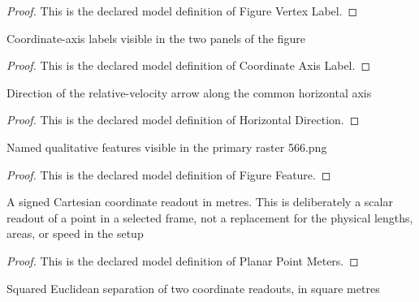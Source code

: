\begin{proof}
  This is the declared model definition of Figure Vertex Label.
\end{proof}
\begin{definition}
  \label{def:physics:phyx-mini-0566:phyxminiproblems-problemphyxmini0566-coordinateaxislabel}
  Coordinate-axis labels visible in the two panels of the figure
\end{definition}
\begin{proof}
  This is the declared model definition of Coordinate Axis Label.
\end{proof}
\begin{definition}
  \label{def:physics:phyx-mini-0566:phyxminiproblems-problemphyxmini0566-horizontaldirection}
  Direction of the relative-velocity arrow along the common horizontal axis
\end{definition}
\begin{proof}
  This is the declared model definition of Horizontal Direction.
\end{proof}
\begin{definition}
  \label{def:physics:phyx-mini-0566:phyxminiproblems-problemphyxmini0566-figurefeature}
  Named qualitative features visible in the primary raster 566.png
\end{definition}
\begin{proof}
  This is the declared model definition of Figure Feature.
\end{proof}
\begin{definition}
  \label{def:physics:phyx-mini-0566:phyxminiproblems-problemphyxmini0566-planarpointmeters}
  A signed Cartesian coordinate readout in metres. This is deliberately a scalar readout of a point in a selected frame, not a replacement for the physical lengths, areas, or speed in the setup
\end{definition}
\begin{proof}
  This is the declared model definition of Planar Point Meters.
\end{proof}
\begin{definition}
  \label{def:physics:phyx-mini-0566:phyxminiproblems-problemphyxmini0566-squareddistancemeters}
  Squared Euclidean separation of two coordinate readouts, in square metres
\end{definition}
